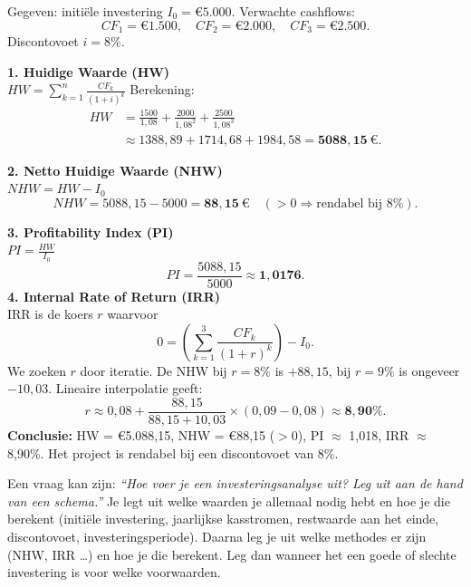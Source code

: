 \documentclass[a4paper,11pt]{article}
\begin{document}
\begin{oefenblok}
    Gegeven: initiële investering $I_0=\text{€}5.000$. Verwachte cashflows:
    \[
        CF_1=\text{€}1.500,\quad CF_2=\text{€}2.000,\quad CF_3=\text{€}2.500.
    \]
    Discontovoet $i=8\%$.

    \textbf{1. Huidige Waarde (HW)}\\
    $HW=\sum_{k=1}^{n}\frac{CF_k}{(1+i)^k}$
    Berekening:
    \[
        \begin{aligned}
            HW & = \frac{1500}{1{,}08}+\frac{2000}{1{,}08^2}+\frac{2500}{1{,}08^3}         \\
               & \approx 1388{,}89 + 1714{,}68 + 1984{,}58 = \mathbf{5088{,}15\ \text{€}}.
        \end{aligned}
    \]

    \textbf{2. Netto Huidige Waarde (NHW)}\\
    $NHW = HW - I_0$
    \[
        NHW = 5088{,}15 - 5000 = \mathbf{88{,}15\ \text{€}} \quad (>0 \Rightarrow \text{rendabel bij }8\%).
    \]

    \textbf{3. Profitability Index (PI)}\\
    $PI = \frac{HW}{I_0}$
    \[
        PI = \frac{5088{,}15}{5000} \approx \mathbf{1{,}0176}.
    \]
    \textbf{4. Internal Rate of Return (IRR)}\\
    IRR is de koers $r$ waarvoor
    \[
        0 = \left(\sum_{k=1}^{3}\frac{CF_k}{(1+r)^k}\right) - I_0.
    \]
    We zoeken $r$ door iteratie. De NHW bij $r=8\%$ is $+88{,}15$, bij $r=9\%$ is ongeveer $-10{,}03$. Lineaire interpolatie geeft:
    \[
        r \approx 0{,}08 + \frac{88{,}15}{88{,}15 + 10{,}03}\times(0{,}09-0{,}08)
        \approx \mathbf{8{,}90\%}.
    \]
    \textbf{Conclusie:} HW = €5.088,15, NHW = €88,15 ($>0$), PI $\approx$ 1,018, IRR $\approx$ 8,90\%. Het project is rendabel bij een discontovoet van 8\%.
\end{oefenblok}

\begin{examenbox}
    Een vraag kan zijn: \textit{``Hoe voer je een investeringsanalyse uit? Leg uit aan de hand van een schema.''}
    Je legt uit welke waarden je allemaal nodig hebt en hoe je die berekent (initiële investering, jaarlijkse kasstromen, restwaarde aan het einde, discontovoet, investeringsperiode).
    Daarna leg je uit welke methodes er zijn (NHW, IRR \dots) en hoe je die berekent.
    Leg dan wanneer het een goede of slechte investering is voor welke voorwaarden.
\end{examenbox}
\end{document}
